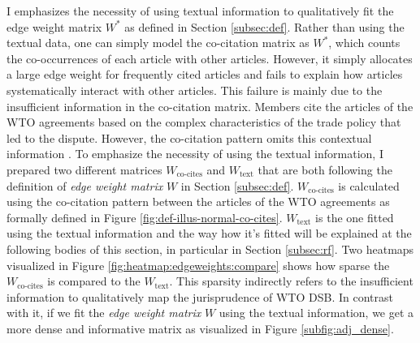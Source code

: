 I emphasizes the necessity of using textual information
to qualitatively fit the edge weight matrix $W^*$ as defined in Section \ref{subsec:def}. 
Rather than using the textual data, one can simply model the co-citation matrix as $W^*$, which counts the co-occurrences of each article with other articles.
However, it simply allocates a large edge weight for frequently cited articles and fails to explain how articles systematically interact with other articles.
This failure is mainly due to the insufficient information in the co-citation matrix. Members cite the articles of
the WTO agreements based on the complex characteristics of
the trade policy that led to the dispute. 
However, the co-citation pattern omits this contextual information . To emphasize the necessity of using the textual information, I prepared two different matrices $W_{\text{co-cites}}$ and $W_{\text{text}}$ that are both following the definition of \textit{edge weight matrix} $W$ in Section \ref{subsec:def}.
$W_{\text{co-cites}}$ is calculated using the co-citation pattern between the articles of the WTO agreements as formally defined
in Figure %
\ref{fig:def-illus-normal-co-cites}.
$W_{\text{text}}$ is the one fitted using the textual information and the way how it's fitted will be explained at the following bodies of this section, in particular in Section \ref{subsec:rf}.
Two heatmaps visualized in Figure \ref{fig:heatmap:edgeweights:compare} shows how sparse the $W_{\text{co-cites}}$ is compared to the $W_{\text{text}}$. This sparsity indirectly refers to the insufficient information
to qualitatively map the jurisprudence of WTO DSB.
In contrast with it, if we fit the \textit{edge weight matrix} $W$ using the textual information, we get a more dense and informative matrix as visualized in Figure \ref{subfig:adj_dense}.


